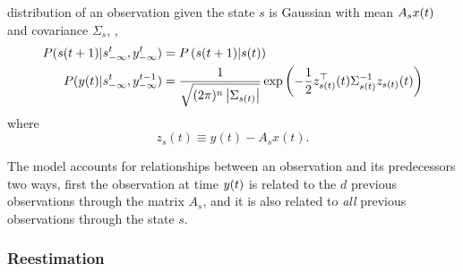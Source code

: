 distribution of an observation given the state $s$ is Gaussian with
mean $A_s {x}{(t)}$ and covariance $\Sigma_s$, \ie,
\begin{align}
  \label{eq:assume_markovVARG}
  P({s}{(t+1)}|s_{-\infty}^{t},y_{-\infty}^{t}) &= 
  P\left({s}{(t+1)}|{s}{(t)}\right)\\
  \label{eq:assume_outputVARG}
  P({y}{(t)}|s_{-\infty}^{t},y_{-\infty}^{t-1}) &=
    \frac{1}{\sqrt{ (2 \pi)^n \left|\Sigma_{s(t)}\right|}}
    \exp\left({-\frac{1}{2} z_{s(t)}^\top(t) \Sigma_{s(t)}^{-1}
    z_{s(t)}(t)} \right)
\end{align}
where
\begin{equation*}
z_s(t) \equiv y(t) - A_s x(t).  
\end{equation*}

The model accounts for relationships between an observation and its
predecessors two ways, first the observation at time ${y}{(t)}$ is
related to the $d$ previous observations through the matrix $A_s$, and
it is also related to \emph{all} previous observations through the state $s$.

\subsubsection{Reestimation}

